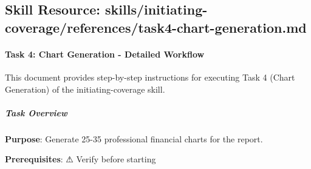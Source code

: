 \documentclass[11pt]{article}
\begin{document}
\subsection{Skill Resource: skills/initiating-coverage/references/task4-chart-generation.md}\label{file:skills-initiating-coverage-references-task4-chart-generation-md}

\paragraph{Task 4: Chart Generation - Detailed Workflow}\mbox{}\par

This document provides step-by-step instructions for executing Task 4 (Chart Generation) of the initiating-coverage skill.


\subparagraph{Task Overview}\mbox{}\par

\textbf{Purpose}: Generate 25-35 professional financial charts for the report.


\textbf{Prerequisites}: ⚠ Verify before starting
\end{document}
